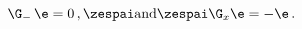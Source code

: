 \begin{equation} \label{proj1}
\G_- \, \e=0 \,, \zespai \textrm{and} \zespai \G_{x}\e=-\e \,.
\end{equation}

